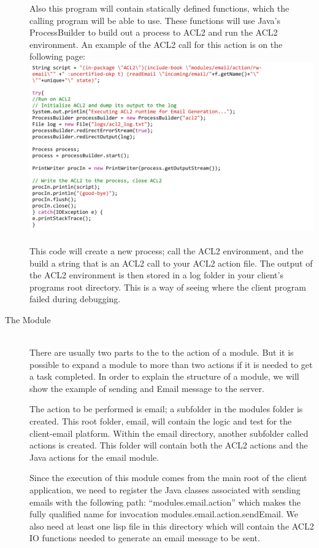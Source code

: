 \documentclass[11pt, letterpaper]{report}
\begin{document}
\begin{description}
Also this program will contain statically defined functions, which the calling program will be able to use. These functions will use Java’s ProcessBuilder to build out a process to ACL2 and run the ACL2 environment. An example of the ACL2 call for this action is on the following page:\newpage
\includegraphics[scale=0.8]{javaproc}\\\\
This code will create a new process; call the ACL2 environment, and the build a string that is an ACL2 call to your ACL2 action file. The output of the ACL2 environment is then stored in a log folder in your client’s programs root directory. This is a way of seeing where the client program failed during debugging. \\
\item[The Module]\hfill \\
There are usually two parts to the to the action of a module. But it is possible to expand a module to more than two actions if it is needed to get a task completed. In order to explain the structure of a module, we will show the example of sending and Email message to the server. 

The action to be performed is email; a subfolder in the modules folder is created. This root folder, email, will contain the logic and test for the client-email platform. Within the email directory, another subfolder called actions is created. This folder will contain both the ACL2 actions and the Java actions for the email module. 

Since the execution of this module comes from the main root of the client application, we need to register the Java classes associated with sending emails with the following path: ``modules.email.action'' which makes the fully qualified name for invocation modules.email.action.sendEmail. We also need at least one lisp file in this directory which will contain the ACL2 IO functions needed to generate an email message to be sent. 


\end{description}
\end{document}
